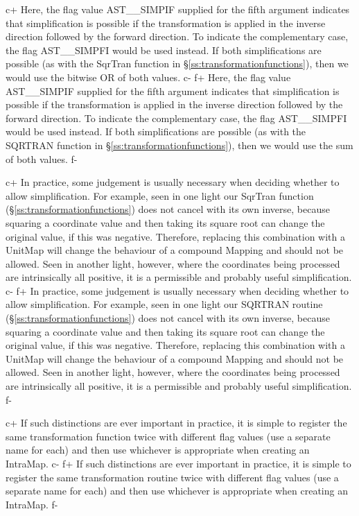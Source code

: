\documentclass[twoside,11pt]{starlink}
\providecommand{\secref}[1]{\S\ref{#1}}
\begin{document}
c+
Here, the flag value AST\_\_SIMPIF supplied for the fifth argument
indicates that simplification is possible if the transformation is
applied in the inverse direction followed by the forward direction. To
indicate the complementary case, the flag AST\_\_SIMPFI would be used
instead. If both simplifications are possible (as with the SqrTran
function in \secref{ss:transformationfunctions}), then we would use
the bitwise OR of both values.
c-
f+
Here, the flag value AST\_\_SIMPIF supplied for the fifth argument
indicates that simplification is possible if the transformation is
applied in the inverse direction followed by the forward direction. To
indicate the complementary case, the flag AST\_\_SIMPFI would be used
instead. If both simplifications are possible (as with the SQRTRAN
function in \secref{ss:transformationfunctions}), then we would use
the sum of both values.
f-

c+
In practice, some judgement is usually necessary when deciding whether
to allow simplification. For example, seen in one light our SqrTran
function (\secref{ss:transformationfunctions}) does not cancel with
its own inverse, because squaring a coordinate value and then taking
its square root can change the original value, if this was
negative. Therefore, replacing this combination with a UnitMap will
change the behaviour of a compound Mapping and should not be
allowed. Seen in another light, however, where the coordinates being
processed are intrinsically all positive, it is a permissible and
probably useful simplification.
c-
f+
In practice, some judgement is usually necessary when deciding whether
to allow simplification. For example, seen in one light our SQRTRAN
routine (\secref{ss:transformationfunctions}) does not cancel with its
own inverse, because squaring a coordinate value and then taking its
square root can change the original value, if this was
negative. Therefore, replacing this combination with a UnitMap will
change the behaviour of a compound Mapping and should not be
allowed. Seen in another light, however, where the coordinates being
processed are intrinsically all positive, it is a permissible and
probably useful simplification.
f-

c+
If such distinctions are ever important in practice, it is simple to
register the same transformation function twice with different flag
values (use a separate name for each) and then use whichever is
appropriate when creating an IntraMap.
c-
f+
If such distinctions are ever important in practice, it is simple to
register the same transformation routine twice with different flag
values (use a separate name for each) and then use whichever is
appropriate when creating an IntraMap.
f-
\end{document}
